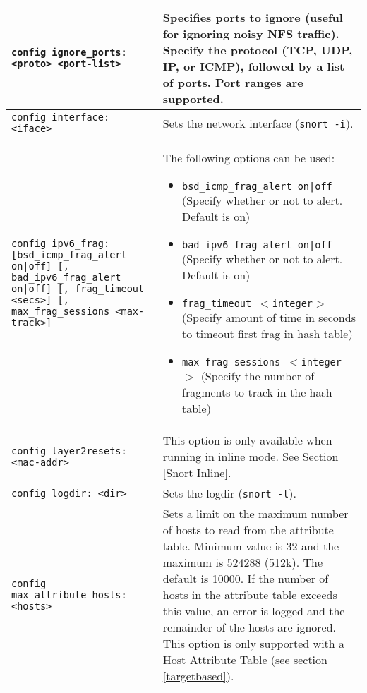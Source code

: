 \documentclass[english]{report}
\begin{document}
\begin{center}
\begin{longtable}[t]{| p{2.5in} | p{3.5in} |}
\hline
\texttt{config ignore\_ports: <proto> <port-list>} & Specifies ports to ignore
(useful for ignoring noisy NFS traffic). Specify the protocol (TCP, UDP, IP, or
ICMP), followed by a list of ports. Port ranges are supported.\\

\hline
\texttt{config interface: <iface>} & Sets the network interface (\texttt{snort
-i}). \\

\hline
\texttt{config ipv6\_frag: [bsd\_icmp\_frag\_alert on|off] [,
bad\_ipv6\_frag\_alert on|off] [, frag\_timeout <secs>] [, max\_frag\_sessions
<max-track>]} & The following options can be used:

\begin{itemize}

\item \texttt{bsd\_icmp\_frag\_alert on|off} (Specify whether or not to alert.
Default is on)

\item \texttt{bad\_ipv6\_frag\_alert on|off} (Specify whether or not to alert.
Default is on)

\item \texttt{frag\_timeout $<$integer$>$} (Specify amount of time in seconds
to timeout first frag in hash table)

\item \texttt{max\_frag\_sessions $<$integer$>$} (Specify the number of
fragments to track in the hash table)

\end{itemize} \\

\hline
\texttt{config layer2resets: <mac-addr>} & This option is only available
when running in inline mode. See Section \ref{Snort Inline}.\\

\hline
\texttt{config logdir: <dir>} & Sets the logdir (\texttt{snort -l}).
\\

\hline
\texttt{config max\_attribute\_hosts: <hosts>} & Sets a limit on the maximum
number of hosts to read from the attribute table.  Minimum value is 32 and the
maximum is 524288 (512k).  The default is 10000.  If the number of hosts in the
attribute table exceeds this value, an error is logged and the remainder of the
hosts are ignored.  This option is only supported with a Host Attribute Table
(see section \ref{targetbased}). \\


\end{longtable}
\end{center}
\end{document}
